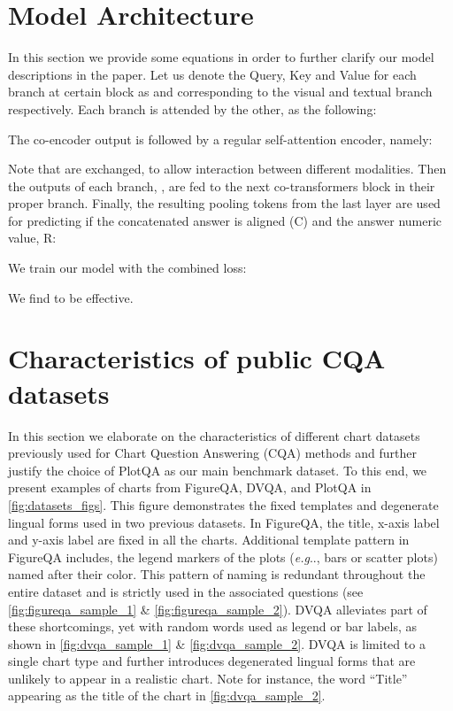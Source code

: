 \documentclass[runningheads]{llncs}
\makeatletter
\DeclareRobustCommand\onedot{\futurelet\@let@token\@onedot}
\def\@onedot{\ifx\@let@token.\else.\null\fi\xspace}
\def\eg{\emph{e.g}\onedot} \def\Eg{\emph{E.g}\onedot}
\makeatother
\begin{document}
\section{Model Architecture}
In this section we provide some equations in order to further clarify our model descriptions in the paper. Let us denote the Query, Key and Value for each branch at certain block as  and  corresponding to the visual and textual branch respectively. Each branch is attended by the other, as the following:

    The co-encoder output is followed by a regular self-attention encoder, namely:

Note that  are exchanged, to allow interaction between different modalities. Then the outputs of each branch, , are fed to the next co-transformers block in their proper branch. Finally, the resulting  pooling tokens from the last layer are used for predicting if the concatenated answer is aligned (C) and the answer numeric value, R: 

We train our model with the combined loss:

We find  to be effective.
\section{Characteristics of public CQA datasets}
\label{sec:public_cqa}
In this section we elaborate on the characteristics of different chart datasets previously used for Chart Question Answering (CQA) methods and further justify the choice of PlotQA as our main benchmark dataset. To this end, we present examples of charts from FigureQA, DVQA, and PlotQA in \cref{fig:datasets_figs}. This figure demonstrates the fixed templates and degenerate lingual forms used in two previous datasets. In FigureQA, the title, x-axis label and y-axis label are fixed in all the charts. Additional template pattern in FigureQA includes, the legend markers of the plots (\eg, bars or scatter plots) named after their color. This pattern of naming is redundant throughout the entire dataset and is strictly used in the associated questions (see \cref{fig:figureqa_sample_1} \& \ref{fig:figureqa_sample_2}). DVQA alleviates part of these shortcomings, yet with random words used as legend or bar labels, as shown in \cref{fig:dvqa_sample_1} \& \ref{fig:dvqa_sample_2}. DVQA is limited to a single chart type and further introduces degenerated lingual forms that are unlikely to appear in a realistic chart. Note for instance, the word ``Title'' appearing as the title of the chart in \cref{fig:dvqa_sample_2}.
\end{document}
